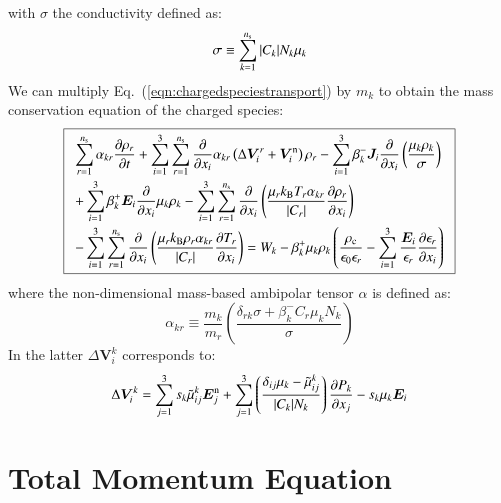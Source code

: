 \documentclass{warpdoc}
\newcommand\frameeqn[1]{\fbox{$\displaystyle #1$}}
\newcommand{\alb}{\vspace{0.1cm}\\} %
\newcommand{\mfd}{\displaystyle}
\newcommand{\ns}{{n_{\rm s}}}
\renewcommand{\vec}[1]{\bm{#1}}
\begin{document}
with $\sigma$ the conductivity defined as:
%
\begin{equation}
 \sigma \equiv \sum_{k=1}^\ns |C_k| N_k \mu_k
\label{eqn:sigma} 
\end{equation}
%
We can multiply Eq.\ (\ref{eqn:chargedspeciestransport})  by $m_k$ to obtain the mass conservation equation of the charged species:
%
\begin{equation}
\frameeqn{
\begin{array}{l}\mfd
  \sum_{r=1}^{\ns} \alpha_{kr} \frac{\partial \rho_r}{\partial t}  
+ \sum_{i=1}^3 \sum_{r=1}^\ns  \frac{\partial}{\partial x_i}      \alpha_{kr} \left( \Delta \vec{V}_i^r + \vec{V}^{\rm n}_i \right)\rho_r
-  \sum_{i=1}^3 \beta_k^- \vec{J}_i \frac{\partial}{\partial x_i}  \left( \frac{\mu_k \rho_k}{\sigma} 
\right) \alb\mfd
+ \sum_{i=1}^3 \beta_k^+ \vec{E}_i \frac{\partial }{\partial x_i} \mu_{k} \rho_{k}
- \sum_{i=1}^3 \sum_{r=1}^{\ns} \frac{\partial}{\partial x_i} \left(\frac{\mu_r k_{\rm B} T_r \alpha_{kr}}{|C_r|}  \frac{\partial \rho_r}{\partial x_i}\right) \alb\mfd
- \sum_{i=1}^3 \sum_{r=1}^\ns \frac{\partial}{\partial x_i} \left( \frac{\mu_r k_{\rm B} \rho_r  \alpha_{kr}}{|C_r|}   \frac{\partial T_r}{\partial x_i} \right)
= W_k
-\beta_k^+ \mu_{k} \rho_{k}\left(
  \frac{\rho_{\rm c}}{\epsilon_0\epsilon_r}
  -\sum_{i=1}^3 \frac{\vec{E}_i}{\epsilon_r} \frac{\partial \epsilon_r}{\partial x_i}  
\right)
\end{array}
}
\label{eqn:masscharged}
\end{equation}
%
%
where the non-dimensional mass-based ambipolar tensor $\alpha$ is defined as:
%
\begin{equation}
\alpha_{kr} \equiv \frac{m_k}{m_r}\left(\frac{\delta_{rk}\sigma + \beta^-_k C_r  \mu_k N_k}{\sigma}\right)
\end{equation}
%
In the latter $\Delta \vec{V}_i^k$ corresponds to:
%
\begin{equation}
 \Delta \vec{V}_i^k = 
   \sum_{j=1}^3 s_k \wtilde{\mu}^k_{ij}  \vec{E}_j^{\rm n}
      + \sum_{j=1}^3  \left(\frac{\delta_{ij} \mu_k-\wtilde{\mu}^{k}_{ij}}{|C_k| N_k}\right) \frac{\partial P_k}{\partial x_j}
-  s_k \mu_k  \vec{E}_i
\end{equation}
%




\section{Total Momentum Equation}
\end{document}
